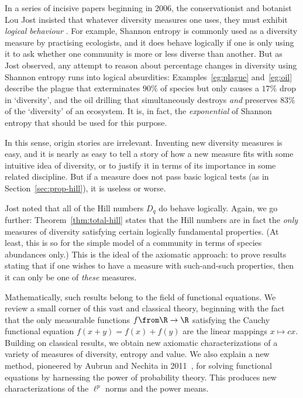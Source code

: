 In a series of incisive papers beginning in 2006, the
conservationist and botanist Lou Jost%
%
%
insisted that whatever diversity measures one uses, they must exhibit
\emph{logical behaviour}%
%
%
\cite{JostED,JostPDI,JostGST,JostMBD}.  For
example, Shannon entropy is commonly used as a diversity measure by
practising ecologists, and it does behave logically if one is only using it
to ask whether one community is more or less diverse than another.  But as Jost
observed, any attempt to reason about percentage changes in diversity using
Shannon entropy runs into logical absurdities: Examples~\ref{eg:plague}
and~\ref{eg:oil} describe the plague that exterminates $90\%$ of species
but only causes a $17\%$ drop in `diversity', and the oil drilling that
simultaneously destroys \emph{and} preserves $83\%$ of the `diversity' of
an ecosystem.  It is, in fact, the \emph{exponential} of Shannon entropy
that should be used for this purpose.

In this sense, origin stories are irrelevant.  Inventing new diversity
measures is easy, and it is nearly as easy to tell a story of how a new
measure fits with some intuitive idea of diversity, or to justify it in
terms of its importance in some related discipline.  But if a measure does
not pass basic logical tests (as in Section~\ref{sec:prop-hill}), it is
useless or worse.

Jost noted that all of the Hill numbers $D_q$ do behave logically.  Again,
we go further: Theorem~\ref{thm:total-hill} states that the Hill numbers
are in fact the \emph{only} measures of diversity satisfying certain
logically fundamental properties.  (At least, this is so for the simple
model of a community in terms of species abundances only.)  This is the
ideal of the axiomatic approach: to prove results stating that if one
wishes to have a measure with such-and-such properties, then it can only be
one of \emph{these} measures.

Mathematically, such results belong to the field of functional equations.  We
review a small corner of this vast and classical theory, beginning with the
fact that the only measurable functions $f \from \R \to \R$ satisfying the
Cauchy functional equation $f(x + y) = f(x) + f(y)$ are the linear mappings
$x \mapsto cx$.  Building on classical results, we obtain new axiomatic
characterizations of a variety of measures of diversity, entropy and value.
We also explain a new method, pioneered by Aubrun%
%
%
and Nechita%
%
%
in
2011~\cite{AuNe}, for solving functional equations by harnessing the power
of probability theory.  This produces new characterizations of the $\ell^p$
norms and the power means.

